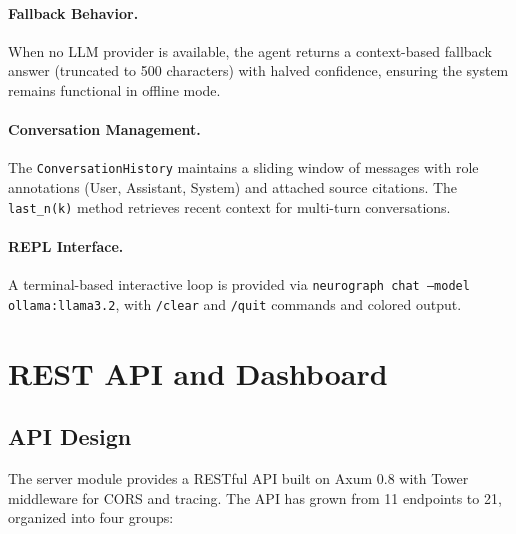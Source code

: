 \documentclass[11pt,a4paper,twocolumn]{article}
\begin{document}
\paragraph{Fallback Behavior.}
When no LLM provider is available, the agent returns a context-based
fallback answer (truncated to 500 characters) with halved confidence,
ensuring the system remains functional in offline mode.

\paragraph{Conversation Management.}
The \texttt{ConversationHistory} maintains a sliding window of
messages with role annotations (User, Assistant, System) and
attached source citations. The \texttt{last\_n(k)} method retrieves
recent context for multi-turn conversations.

\paragraph{REPL Interface.}
A terminal-based interactive loop is provided via \texttt{neurograph
chat --model ollama:llama3.2}, with \texttt{/clear} and
\texttt{/quit} commands and colored output.

\section{REST API and Dashboard}
\label{sec:server}

\subsection{API Design}

The server module provides a RESTful API built on Axum 0.8 with
Tower middleware for CORS and tracing. The API has grown from 11
endpoints to 21, organized into four groups:
\end{document}
